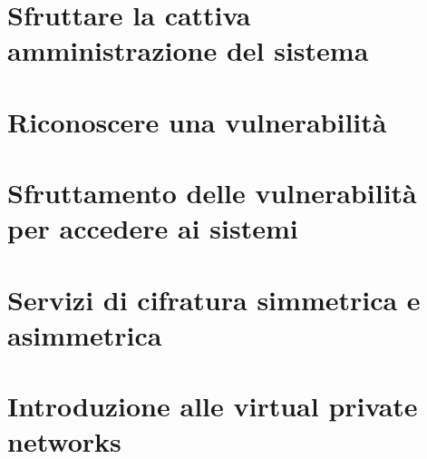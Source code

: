 \chapter{Sfruttare la cattiva amministrazione del sistema}				%
    
\chapter{Riconoscere una vulnerabilità} 								%

\chapter{Sfruttamento delle vulnerabilità per accedere ai sistemi}		%
 
\chapter{Servizi di cifratura simmetrica e asimmetrica}					%
 
\chapter{Introduzione alle virtual private networks}					%
 
